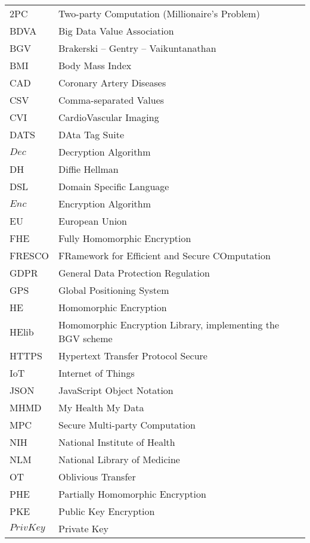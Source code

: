 \abbreviations
\begin{center}
	\renewcommand{\arraystretch}{1.5}
	\begin{longtable}{ l @{\qquad} l }
	\toprule
	2PC       & Two-party Computation (Millionaire's Problem) \\
	BDVA 			& Big Data Value Association \\
	BGV       & Brakerski -- Gentry -- Vaikuntanathan \\
	BMI       & Body Mass Index \\
	CAD 			& Coronary Artery Diseases \\
	CSV 			& Comma-separated Values \\
	CVI 			& CardioVascular Imaging \\
	DATS 			& DAta Tag Suite \\
	$Dec$     & Decryption Algorithm \\
	DH				& Diffie Hellman \\
	DSL       & Domain Specific Language \\
	$Enc$     & Encryption Algorithm \\
	EU				& European Union \\
	FHE       & Fully Homomorphic Encryption \\
	FRESCO  	& FRamework for Efficient and Secure COmputation \\
	GDPR 			& General Data Protection Regulation \\
	GPS 			& Global Positioning System \\
	HE        & Homomorphic Encryption \\
	HElib     & Homomorphic Encryption Library, implementing the BGV scheme \\
	HTTPS 		& Hypertext Transfer Protocol Secure \\
	IoT				& Internet of Things \\
	JSON 			& JavaScript Object Notation \\
	MHMD 			& My Health My Data \\
	MPC 			& Secure Multi-party Computation \\
	NIH 			& National Institute of Health \\
	NLM 			& National Library of Medicine \\
	OT        & Oblivious Transfer \\
	PHE       & Partially Homomorphic Encryption \\
	PKE 			& Public Key Encryption \\
	$PrivKey$	& Private Key \\

\end{longtable}
\end{center}
